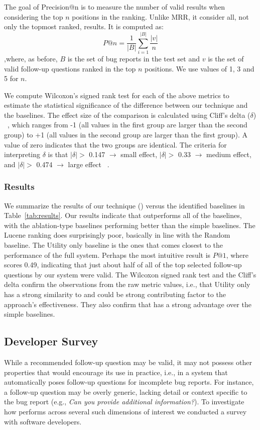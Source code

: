 The goal of Precision@n is to measure the number of valid results when considering the top $n$ positions in the ranking. Unlike MRR, it consider all, not only the topmost ranked, results. It is computed as: $$P@n = \frac{1}{|B|} \sum_{i=1}^{|B|} \frac{|v|}{n}$$ ,where, as before, $B$ is the set of bug reports in the test set and $v$ is the set of valid follow-up questions ranked in the top $n$ positions. We use values of 1, 3 and 5 for $n$.

We compute Wilcoxon's signed rank test for each of the above metrics to estimate the statistical significance of the difference between our technique \evpi and the baselines. The effect size of the comparison is calculated using Cliff's delta ($\delta$) ~\cite{cliff1993dominance}, which ranges from -1 (all values in the first group are larger than the second group) to +1 (all values in the second group are larger than the first group). A value of zero indicates that the two groups are identical. The criteria for interpreting $\delta$ is that $|\delta| >$ 0.147 $\rightarrow$ small effect, $|\delta| >$ 0.33 $\rightarrow$ medium effect, and $|\delta| >$ 0.474 $\rightarrow$ large effect ~\cite{romano2006appropriate}.


\subsubsection{Results} We summarize the results of our technique (\evpi) versus the identified
baselines in Table~\ref{tab:results}. Our results indicate that \evpi outperforms all of the baselines,
with the ablation-type baselines performing better than the simple baselines. The Lucene ranking
does surprisingly poor, basically in line with the Random baseline. The Utility only baseline is
the ones that comes closest to the performance of the full system. Perhaps the most intuitive result
is $P@1$, where \evpi scores 0.49, indicating that just about half of all of the top selected follow-up
questions by our system were valid. The Wilcoxon signed rank test and the Cliff's delta confirm the observations from
the raw metric values, i.e., that Utility only has a strong similarity to \evpi and could be strong contributing
factor to the approach's effectiveness. They also confirm that \evpi has a strong advantage over the simple
baselines.


\subsection{Developer Survey}
While a recommended follow-up question may be valid, it may not possess other properties that would
encourage its use in practice, i.e., in a system that automatically poses follow-up questions for incomplete bug reports. For
instance, a follow-up question may be overly generic, lacking detail or context specific to the bug report (e.g., {\em Can you provide
additional information?}). To investigate how \evpi performs across several such dimensions of interest we conducted a survey with
software developers.

